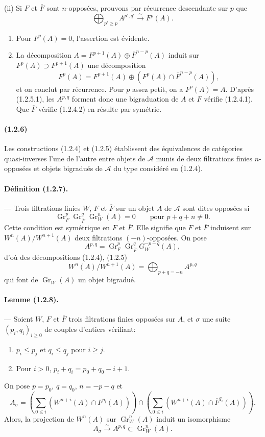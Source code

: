 \documentclass[10pt]{article}
\newcommand{\Gr}{\operatorname{Gr}}
\newcommand{\calA}{\mathcal A}
\newcommand{\iso}{\xrightarrow{\sim}}
\begin{document}
(ii) Si $F$ et $\overline F$ sont $n$-opposées, prouvons par récurrence descendante sur $p$ que
\[
\tag{1.2.5.1}
\bigoplus_{p'\ge p} A^{p',q'}\iso F^p(A).
\]
\begin{enumerate}[label=\alph*)]
\item Pour $F^p(A)=0$, l'assertion est évidente.
\item La décomposition $A=F^{p+1}(A)\oplus\overline F^{n-p}(A)$ induit sur $F^p(A)\supset F^{p+1}(A)$ une décomposition
\[
F^p(A)=F^{p+1}(A)\oplus(F^p(A)\cap\overline F^{n-p}(A)),
\]
et on conclut par récurrence. Pour $p$ assez petit, on a $F^p(A)=A$. D'après (1.2.5.1), les $A^{p,q}$ forment donc une bigraduation de $A$ et $F$ vérifie (1.2.4.1). Que $\overline F$ vérifie (1.2.4.2) en résulte par symétrie.
\end{enumerate}

\paragraph{(1.2.6)} Les constructions (1.2.4) et (1.2.5) établissent des équivalences de catégories quasi-inverses l'une de l'autre entre objets de $\calA$ munis de deux filtrations finies $n$-opposées et objets bigradués de $\calA$ du type considéré en (1.2.4).

\paragraph{Définition (1.2.7).} --- Trois filtrations finies $W$, $F$ et $\overline F$ sur un objet $A$ de $\calA$ sont dites opposées si
\[
\Gr_F^p\Gr_{\overline F}^{q}\Gr_W^n(A)=0\qquad\text{pour }p+q+n\ne0.
\]
Cette condition est symétrique en $F$ et $\overline F$. Elle signifie que $F$ et $\overline F$ induisent sur $W^n(A)/W^{n+1}(A)$ deux filtrations $(-n)$-opposées. On pose
\[
A^{p,q}=\Gr_F^p\Gr_{\overline F}^{q}G_W^{-p-q}(A),
\]
d'où des décompositions (1.2.4), (1.2.5)
\[
\tag{1.2.7.1}
W^n(A)/W^{n+1}(A)=\bigoplus_{p+q=-n}A^{p,q}
\]
qui font de $\Gr_W(A)$ un objet bigradué.

\paragraph{Lemme (1.2.8).} --- Soient $W$, $F$ et $\overline F$ trois filtrations finies opposées sur $A$, et $\sigma$ une suite $(p_i,q_i)_{i\ge0}$ de couples d'entiers vérifiant:
\begin{enumerate}[label=\alph*)]
\item $p_i\le p_j$ et $q_i\le q_j$ pour $i\ge j$.
\item Pour $i>0$, $p_i+q_i=p_0+q_0-i+1$.
\end{enumerate}
On pose $p=p_0$, $q=q_0$, $n=-p-q$ et
\[
A_\sigma=\left(\sum_{0\le i} (W^{n+i}(A)\cap F^{p_i}(A))\right)
\cap
\left(\sum_{0\le i} (W^{n+i}(A)\cap \overline F^{q_i}(A))\right).
\]
Alors, la projection de $W^n(A)$ sur $\Gr_W^n(A)$ induit un isomorphisme
\[
A_\sigma\iso A^{p,q}\subset\Gr_W^n(A).
\]
\end{document}
